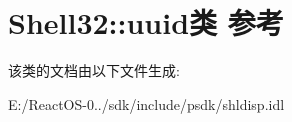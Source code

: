 \hypertarget{class_shell32_1_1uuid}{}\section{Shell32\+:\+:uuid类 参考}
\label{class_shell32_1_1uuid}


该类的文档由以下文件生成\+:\begin{DoxyCompactItemize}
\item 
E\+:/\+React\+O\+S-\/0../sdk/include/psdk/shldisp.\+idl\end{DoxyCompactItemize}
